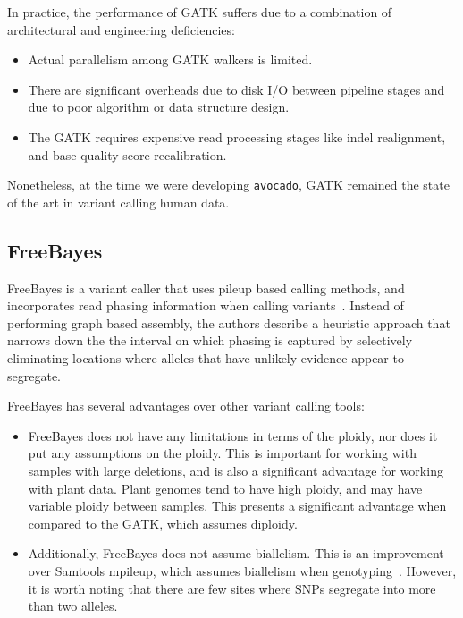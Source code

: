 \documentclass{acm_proc_article-sp}
\begin{document}
In practice, the performance of GATK suffers due to a combination of architectural
and engineering deficiencies:

\begin{itemize}
\item Actual parallelism among GATK walkers is limited.
\item There are significant overheads due to disk I/O between pipeline stages and due
to poor algorithm or data structure design.
\item The GATK requires expensive read processing stages like indel realignment, and base quality score recalibration.
\end{itemize}

Nonetheless, at the time we were developing \texttt{avocado}, GATK remained the
state of the art in variant calling human data.

\subsection{FreeBayes}
\label{sec:freebayes}

FreeBayes is a variant caller that uses pileup based calling methods, and incorporates read phasing information when calling
variants~\cite{garrison12}. Instead of performing graph based assembly, the authors describe a heuristic approach that narrows
down the the interval on which phasing is captured by selectively eliminating locations where alleles that have unlikely evidence
appear to segregate.

FreeBayes has several advantages over other variant calling tools:

\begin{itemize}
\item FreeBayes does not have any limitations in terms of the ploidy, nor does it put any assumptions on the ploidy. This
is important for working with samples with large deletions, and is also a significant advantage for working with plant data. Plant
genomes tend to have high ploidy, and may have variable ploidy between samples. This presents a significant advantage
when compared to the GATK, which assumes diploidy.
\item Additionally, FreeBayes does not assume biallelism. This is an improvement over Samtools mpileup, which assumes
biallelism when genotyping~\cite{li11}. However, it is worth noting that there are few sites where SNPs segregate into more than
two alleles.
\end{itemize}
\end{document}
